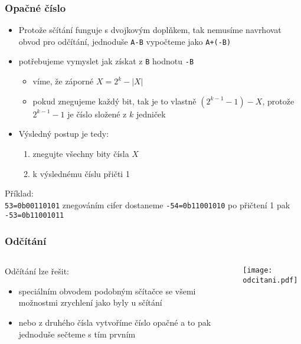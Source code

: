 \documentclass{beamer}
\begin{document}
\begin{frame}
\frametitle{Opačné číslo}
\begin{itemize}
\item Protože sčítání funguje s dvojkovým doplňkem, tak nemusíme navrhovat obvod pro odčítání, jednoduše \texttt{A-B} vypočteme jako \texttt{A+(-B)}
\item potřebujeme vymyslet jak získat z \texttt{B} hodnotu \texttt{-B}
\begin{itemize}
\item víme, že záporné $X = 2^k-|X|$
\item pokud znegujeme každý bit, tak je to vlastně $(2^{k-1}-1)-X$, protože $2^{k-1}-1$ je číslo složené z $k$ jedniček
\end{itemize}
\item Výsledný postup je tedy:
\begin{enumerate}
\item znegujte všechny bity čísla $X$
\item k výslednému číslu přičti 1
\end{enumerate}
\end{itemize}

Příklad:\\
\texttt{53=0b00110101} znegováním cifer dostaneme \texttt{-54=0b11001010} po přičtení 1 pak  \texttt{-53=0b11001011}

\end{frame}


\begin{frame}
\frametitle{Odčítání}


\begin{columns}
\begin{column}{0.5\textwidth}
Odčítání lze řešit:
\begin{itemize}
\item speciálním obvodem podobným sčítačce se všemi možnostmi zrychlení jako byly u sčítání
\item nebo z druhého čísla vytvoříme číslo opačné a to pak jednoduše sečteme s tím prvním
\end{itemize}
\end{column}
\hfill
\begin{column}{0.5\textwidth}
\begin{center}
\texttt{[image: odcitani.pdf]}
\end{center}
\end{column}
\end{columns}


\end{frame}
\end{document}
